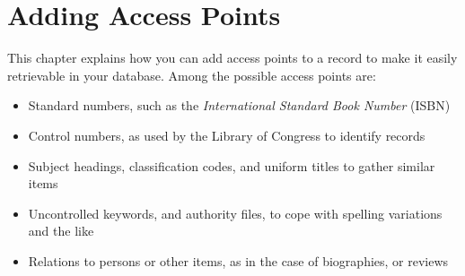
\chapter{Adding Access Points}
\label{cha:addacc}

This chapter explains how you can add access points to a record to
make it easily retrievable in your database.
Among the possible access points are:
\begin{itemize}
\item Standard numbers, such as the \textit{International Standard
    Book Number} (ISBN)
\item Control numbers, as used by the Library of Congress to identify
  records
\item Subject headings, classification codes, and uniform titles to
  gather similar items
\item Uncontrolled keywords, and authority files, to cope with
  spelling variations and the like
\item Relations to persons or other items, as in the case of
  biographies, or reviews
\end{itemize}








